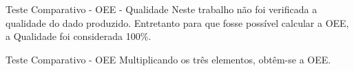 \documentclass{beamer}
\begin{document}
    \begin{frame}{Teste Comparativo - OEE - Qualidade}
      \quad Neste trabalho não foi verificada a qualidade do dado produzido. Entretanto para que fosse possível calcular a OEE, a Qualidade foi considerada 100\%.
    \end{frame}
    \begin{frame}{Teste Comparativo - OEE}
        \quad Multiplicando os três elementos, obtêm-se a OEE.
        \begin{center}

        \end{center}
    \end{frame}
\end{document}
